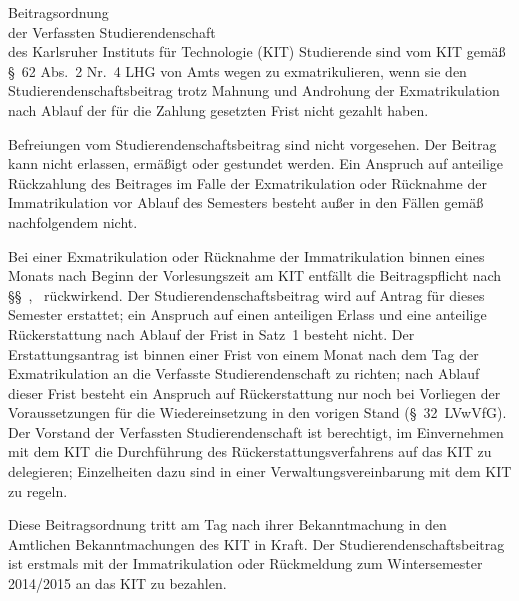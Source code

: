 \begin{jurdoc}[Beitragsordnung]{Beitragsordnung\\der Verfassten Studierendenschaft\\des Karlsruher Instituts für Technologie (KIT)}
Studierende sind vom KIT gemäß §~62 Abs.~2 Nr.~4 LHG von Amts wegen zu exmatrikulieren, wenn sie den Studierendenschaftsbeitrag trotz Mahnung und Androhung der Exmatrikulation nach Ablauf der für die Zahlung gesetzten Frist nicht gezahlt haben.

\label{beitragsordnung:befreiung}
Befreiungen vom Studierendenschaftsbeitrag sind nicht vorgesehen. Der Beitrag kann nicht erlassen, ermäßigt oder gestundet werden. Ein Anspruch auf anteilige Rückzahlung des Beitrages im Falle der Exmatrikulation oder Rücknahme der Immatrikulation vor Ablauf des Semesters besteht außer in den Fällen gemäß nachfolgendem  nicht.

Bei einer Exmatrikulation oder Rücknahme der Immatrikulation binnen eines Monats nach Beginn der Vorlesungszeit am KIT entfällt die Beitragspflicht nach §§~,~ rückwirkend. Der Studierendenschaftsbeitrag wird auf Antrag für dieses Semester erstattet; ein Anspruch auf einen anteiligen Erlass und eine anteilige Rückerstattung nach Ablauf der Frist in Satz~1 besteht nicht. Der Erstattungsantrag ist binnen einer Frist von einem Monat nach dem Tag der Exmatrikulation an die Verfasste Studierendenschaft zu richten; nach Ablauf dieser Frist besteht ein Anspruch auf Rückerstattung nur noch bei Vorliegen der Voraussetzungen für die Wiedereinsetzung in den vorigen Stand (§~32~LVwVfG). Der Vorstand der Verfassten Studierendenschaft ist berechtigt, im Einvernehmen mit dem KIT die Durchführung des Rückerstattungsverfahrens auf das KIT zu delegieren; Einzelheiten dazu sind in einer Verwaltungsvereinbarung mit dem KIT zu regeln.\label{beitragsordnung:befreiung:exmatrikulation}

\label{beitragsordnung:inkrafttreten}
Diese Beitragsordnung tritt am Tag nach ihrer Bekanntmachung in den Amtlichen Bekanntmachungen des KIT in Kraft. Der Studierendenschaftsbeitrag ist erstmals mit der Immatrikulation oder Rückmeldung zum Wintersemester 2014/2015 an das KIT zu bezahlen.

\end{jurdoc}
